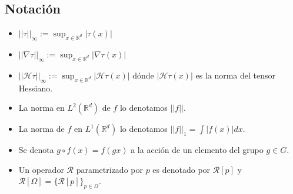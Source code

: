 \subsection{Notación}

\begin{itemize}
    \item $|| \tau ||_\infty := \sup_{x \in \mathbb{R}^d} |\tau(x)|$
    \item $||\nabla \tau ||_\infty := \sup_{x \in \mathbb{R}^d} |\nabla \tau(x)|$
    \item $||\mathcal{H} \tau ||_\infty := \sup_{x \in \mathbb{R}^d} |\mathcal{H} \tau(x)|$ dónde $|\mathcal{H} \tau(x)|$ es la norma del tensor Hessiano. 
    \item La norma en $L^2(\mathbb{R}^d)$ de $f$ lo denotamos $||f||$.
    \item La norma de $f$ en $L^1(\mathbb{R}^d)$ lo denotamos $||f||_1=\int{|f(x)| dx}$.
    \item Se denota $g \circ f(x)=f(gx)$ a la acción de un elemento del grupo $g\in G$.
    \item Un operador  $\mathcal{R}$ parametrizado por $p$ es denotado por $\mathcal{R}[p]$ y $\mathcal{R}[\Omega]=\lbrace \mathcal{R}[p] \rbrace_{p \in \Omega}$. 
\end{itemize}




\endinput
